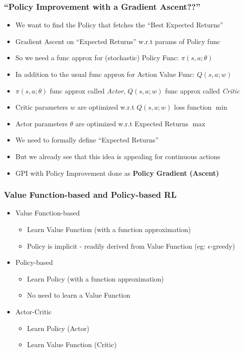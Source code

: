 \documentclass[handout]{beamer}
\begin{document}
\begin{frame}
\frametitle{``Policy Improvement with a Gradient Ascent??''}
\pause
\begin{itemize}[<+->]
\item We want to find the Policy that fetches the ``Best Expected Returns''
\item Gradient Ascent on ``Expected Returns'' w.r.t params of Policy func
\item So we need a func approx for (stochastic) Policy Func: $\pi(s, a; \theta)$
\item In addition to the usual func approx for Action Value Func: $Q(s, a; w)$
\item $\pi(s, a; \theta)$ func approx called {\em Actor}, $Q(s, a; w)$ func approx called {\em Critic}
\item Critic parameters $w$ are optimized w.r.t $Q(s, a; w)$ loss function $\min$
\item Actor parameters $\theta$ are optimized w.r.t Expected Returns $\max$
\item We need to formally define ``Expected Returns''
\item But we already see that this idea is appealing for continuous actions
\item GPI with Policy Improvement done as {\bf Policy Gradient (Ascent)}
\end{itemize}
\end{frame}

\begin{frame}
\frametitle{Value Function-based and Policy-based RL}
\pause
\begin{itemize}[<+->]
\item Value Function-based
\begin{itemize}
\item Learn Value Function (with a function approximation)
\item Policy is implicit - readily derived from Value Function (eg: $\epsilon$-greedy)
\end{itemize}
\item Policy-based
\begin{itemize}
\item Learn Policy (with a function approximation)
\item No need to learn a Value Function
\end{itemize}
\item Actor-Critic
\begin{itemize}
\item Learn Policy (Actor)
\item Learn Value Function (Critic)
\end{itemize}
\end{itemize}
\end{frame}
\end{document}
